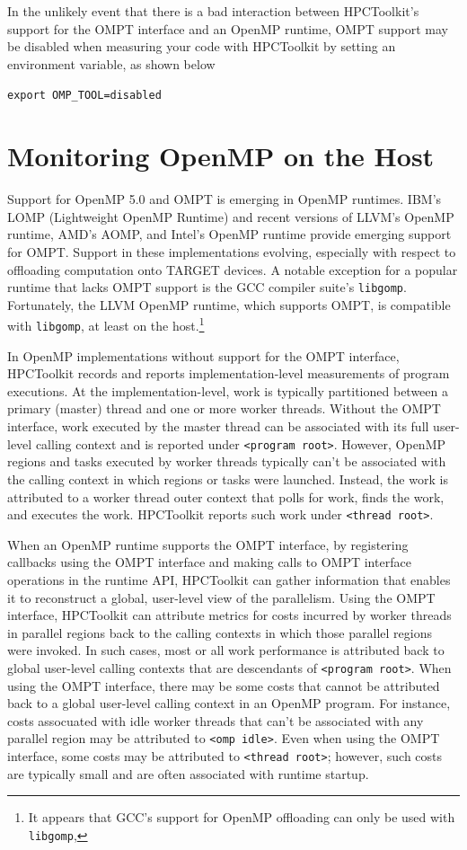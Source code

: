\documentclass[11pt,twoside,letterpaper]{report}
\begin{document}
In the unlikely event that there is a bad interaction between HPCToolkit's support for the OMPT interface
and an OpenMP runtime, OMPT support may be disabled
when measuring your code with HPCToolkit by setting an environment variable, as shown below

\vspace{1ex}
{\tt export OMP\_TOOL=disabled}

\section{Monitoring OpenMP on the Host}
Support for OpenMP 5.0 and OMPT is emerging in OpenMP runtimes.
IBM's LOMP (Lightweight OpenMP Runtime) and recent versions of LLVM's OpenMP runtime,
AMD's AOMP, and Intel's OpenMP runtime provide emerging support
for OMPT. Support in these implementations evolving, especially with respect to offloading computation
onto TARGET devices.
A notable exception for a popular runtime that lacks OMPT support is the GCC compiler suite's {\tt libgomp}. Fortunately, the LLVM OpenMP runtime, which supports OMPT, is compatible with {\tt libgomp}, at least on the host.\footnote{It appears that GCC's support for OpenMP offloading can only be used with {\tt libgomp},}

 In OpenMP implementations without support for the OMPT interface, HPCToolkit records and reports implementation-level measurements of program executions. At the implementation-level, work is typically partitioned between a primary (master) thread and one or more worker threads. Without the OMPT interface, work executed by the master thread can be associated with its full user-level calling context and is reported under \verb|<program root>|. However, OpenMP regions and tasks executed by worker threads typically can't be associated with the calling context in which regions or tasks were launched. Instead, the work is attributed to a worker thread outer context that polls for work, finds the work, and executes the work. HPCToolkit reports such work under \verb|<thread root>|.


When an OpenMP runtime supports the OMPT interface,  by registering  callbacks  using the OMPT interface and  making calls to OMPT interface operations in the runtime API, HPCToolkit can gather information that enables it to reconstruct a global, user-level view of the parallelism. Using the OMPT interface, HPCToolkit can attribute metrics for costs incurred by worker threads in parallel regions back to the calling contexts in which those parallel regions were invoked. In such cases, most or all work performance is attributed back to global user-level calling contexts that are descendants of \verb|<program root>|. When using the OMPT interface, there may be some costs that cannot be attributed back to a global user-level calling context in an OpenMP program. For instance, costs assocuated with idle worker threads that can't be associated with any parallel region may be attributed to \verb|<omp idle>|. Even when using the OMPT interface, some costs may be attributed to \verb|<thread root>|; however, such costs are typically small and are often associated with runtime startup.
\end{document}
